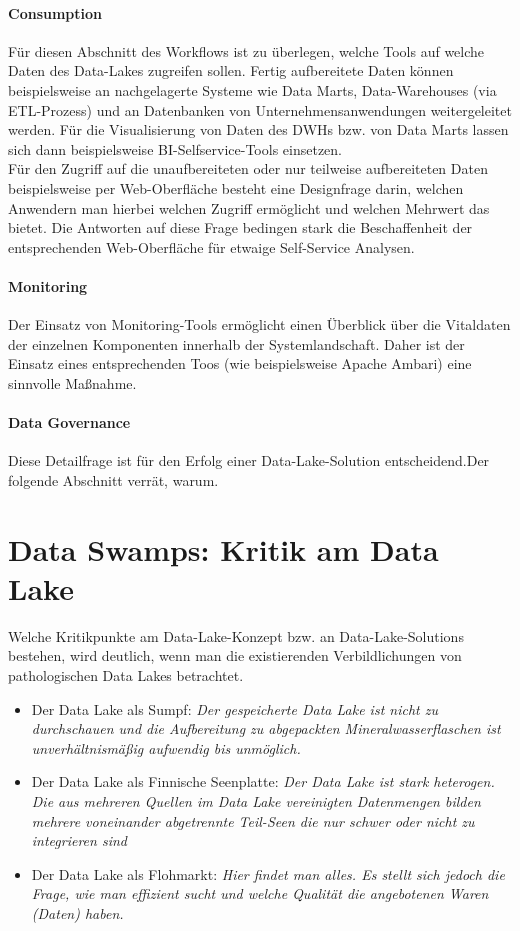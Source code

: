 \documentclass[twoside,twocolumn]{article}
\begin{document}
\paragraph{Consumption}
		Für diesen Abschnitt des Workflows ist zu überlegen, welche Tools auf welche Daten des Data-Lakes zugreifen sollen. Fertig aufbereitete Daten können beispielsweise an nachgelagerte Systeme wie Data Marts, Data-Warehouses (via ETL-Prozess) und an Datenbanken von Unternehmensanwendungen weitergeleitet werden. Für die Visualisierung von Daten des DWHs bzw. von Data Marts lassen sich dann beispielsweise BI-Selfservice-Tools einsetzen.\\
		Für den Zugriff auf die unaufbereiteten oder nur teilweise aufbereiteten Daten beispielsweise per Web-Oberfläche besteht eine Designfrage darin, welchen Anwendern man hierbei welchen Zugriff ermöglicht und welchen Mehrwert das bietet. Die Antworten auf diese Frage bedingen stark die Beschaffenheit der entsprechenden Web-Oberfläche für etwaige Self-Service Analysen.
		\cite{src8}\cite{src12}

\paragraph{Monitoring}
		Der Einsatz von Monitoring-Tools ermöglicht einen Überblick über die Vitaldaten der einzelnen Komponenten innerhalb der Systemlandschaft. Daher ist der Einsatz eines entsprechenden Toos (wie beispielsweise Apache Ambari) eine sinnvolle Maßnahme.\cite{src8}
		
\paragraph{Data Governance}
		Diese Detailfrage ist für den Erfolg einer Data-Lake-Solution entscheidend.Der folgende Abschnitt verrät, warum.


\section{Data Swamps: Kritik am Data Lake}
Welche Kritikpunkte am Data-Lake-Konzept bzw. an Data-Lake-Solutions bestehen, wird deutlich, wenn man die existierenden Verbildlichungen von pathologischen Data Lakes betrachtet.
\begin{itemize}
	\item Der Data Lake als Sumpf: \textit{Der gespeicherte Data Lake ist nicht zu durchschauen und die Aufbereitung zu abgepackten Mineralwasserflaschen ist unverhältnismäßig aufwendig bis unmöglich.\cite{src3}}
	\item Der Data Lake als Finnische Seenplatte:  \textit{Der Data Lake ist stark heterogen. Die aus mehreren Quellen im Data Lake vereinigten Datenmengen bilden mehrere voneinander abgetrennte Teil-Seen die nur schwer oder nicht zu integrieren sind\cite{src13}} 
	\item Der Data Lake als Flohmarkt: \textit{Hier findet man alles. Es stellt sich jedoch die Frage, wie man effizient sucht und welche Qualität die angebotenen Waren (Daten) haben.\cite{src12}} 
\end{itemize}
\end{document}
